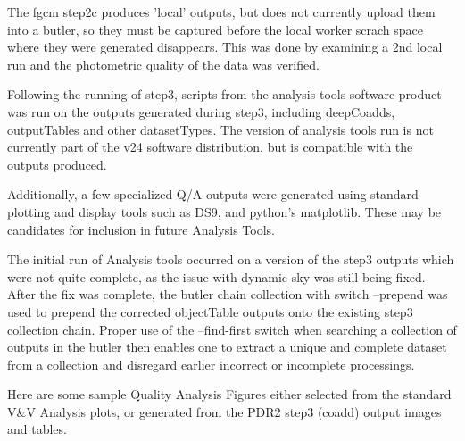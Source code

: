 The fgcm step2c produces 'local' outputs, but does not currently upload them 
into a butler, so they must be captured before the local worker scrach space where they were
generated disappears.
This was done by examining a 2nd local run and the photometric quality of the
data was verified.
 
Following the running of step3, scripts from the analysis tools software product
was run on the outputs generated during step3, including deepCoadds, outputTables and other
datasetTypes. The version of analysis tools run is not currently part of the v24 software distribution,
but is compatible with the outputs produced.

Additionally, a few specialized Q/A outputs were generated using standard plotting and display
tools such as DS9, and python's matplotlib.  These may be candidates for inclusion in future 
Analysis Tools.

The initial run of Analysis tools occurred on a version of the step3 outputs which were not
quite complete, as the issue with dynamic sky was still being fixed.  
After the fix was complete,  the butler chain collection with switch --prepend was used to
prepend the corrected objectTable outputs onto the existing step3 collection chain.
Proper use of the --find-first switch when searching a collection of outputs in the butler then
enables one to extract a unique and complete dataset from a collection and disregard earlier incorrect or 
incomplete processings.

Here are some sample Quality Analysis Figures either selected from the 
standard V\&V Analysis plots, or generated from the PDR2 step3 (coadd) 
output images and tables.

